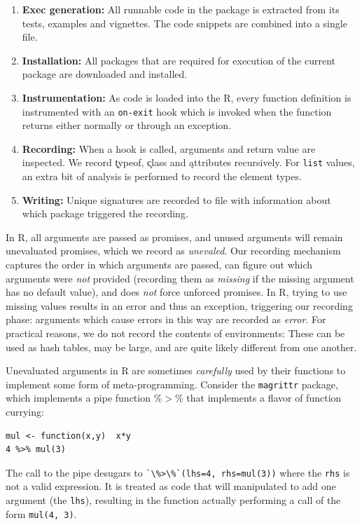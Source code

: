 \documentclass[acmsmall,10pt,review,anonymous]{acmart}\settopmatter{printfolios=true,printccs=false,printacmref=false}
\newcommand{\code}[1]{\lstinline|#1|\xspace}
\begin{document}
\begin{enumerate}
\item {\bf Exec generation:} All runnable code in the package is extracted
  from its tests, examples and vignettes. The code snippets are combined
  into a single file.
\item {\bf Installation:} All packages that are required for execution of
  the current package are downloaded and installed.
\item {\bf Instrumentation:} As code is loaded into the R, every function
  definition is instrumented with an \code{on-exit} hook which is invoked
  when the function returns either normally or through an exception.
\item {\bf Recording:} When a hook is called, arguments and return value are
  inspected. We record \k{typeof}, \k{class} and \k{attributes} recursively.
  For \code{list} values, an extra bit of analysis is performed to record
  the element types.
\item {\bf Writing:} Unique signatures are recorded to file with information
  about which package triggered the recording.
\end{enumerate}

In R, all arguments are passed as promises, and unused arguments will remain unevaluated promises, which we record as {\it unevaled}. 
Our recording mechanism captures the order in which arguments are passed, can figure out which arguments were {\it not} provided (recording them as {\it missing} if the missing argument has no default value), and does {\it not} force unforced promises.
In R, trying to use missing values results in an error and thus an exception, triggering our recording phase: arguments which cause errors in this way are recorded as {\it error}.
For practical reasons, we do not record the contents of environments:
These can be used as hash tables, may be large, and are quite likely different from one another.

Unevaluated arguments in R are sometimes {\it carefully} used by their functions to implement some form of meta-programming.
Consider the {\tt magrittr} package, which implements a pipe function \%$>$\% that implements a flavor of function currying:

{\small\begin{lstlisting}[style=R]
mul <- function(x,y)  x*y
4 %>% mul(3)
\end{lstlisting}}

The call to the pipe desugars to \code{`\%>\%`(lhs=4, rhs=mul(3))} where the
\code{rhs} is not a valid expression. It is treated as code that will
manipulated to add one argument (the \code{lhs}), resulting in the function
actually performing a call of the form \code{mul(4, 3)}.
\end{document}
